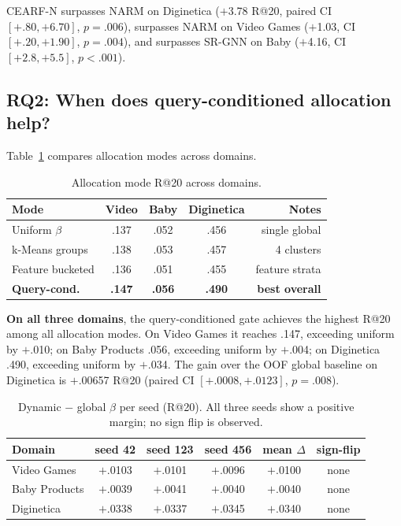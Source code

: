 \documentclass[runningheads]{llncs}
\newcommand{\method}{CEARF-N}
\begin{document}
\method{} surpasses NARM on Diginetica ($+$3.78 R@20, paired CI
$[+.80,+6.70]$, $p\!=\!.006$), surpasses NARM on Video Games
($+$1.03, CI $[+.20,+1.90]$, $p\!=\!.004$), and surpasses SR-GNN on Baby
($+$4.16, CI $[+2.8,+5.5]$, $p\!<\!.001$).

\subsection{RQ2: When does query-conditioned allocation help?}

Table~\ref{tab:alloc} compares allocation modes across domains.

\begin{table}[H]
\caption{Allocation mode R@20 across domains.}
\label{tab:alloc}
\centering\scriptsize
\begin{tabular}{lcccr}
\toprule
Mode & Video & Baby & Diginetica & Notes\\
\midrule
Uniform $\beta$ & .137 & .052 & .456 & single global\\
k-Means groups & .138 & .053 & .457 & 4 clusters\\
Feature bucketed & .136 & .051 & .455 & feature strata\\
\textbf{Query-cond.} & \textbf{.147} & \textbf{.056} & \textbf{.490} & \textbf{best overall}\\
\bottomrule
\end{tabular}
\end{table}

\textbf{On all three domains}, the query-conditioned gate achieves the highest
R@20 among all allocation modes. On Video Games it reaches .147, exceeding
uniform by $+$.010; on Baby Products .056, exceeding uniform by $+$.004;
on Diginetica .490, exceeding uniform by $+$.034. The gain over the
OOF global baseline on Diginetica is $+$.00657 R@20 (paired CI
$[+.0008,+.0123]$, $p\!=\!.008$).

\begin{table}[H]
\caption{Dynamic $-$ global $\beta$ per seed (R@20). All three seeds show a
positive margin; no sign flip is observed.}
\label{tab:seed_delta}
\centering\scriptsize
\begin{tabular}{lccccc}
\toprule
Domain & seed 42 & seed 123 & seed 456 & mean $\Delta$ & sign-flip\\
\midrule
Video Games & $+$.0103 & $+$.0101 & $+$.0096 & $+$.0100 & none\\
Baby Products & $+$.0039 & $+$.0041 & $+$.0040 & $+$.0040 & none\\
Diginetica & $+$.0338 & $+$.0337 & $+$.0345 & $+$.0340 & none\\
\bottomrule
\end{tabular}
\end{table}
\end{document}

